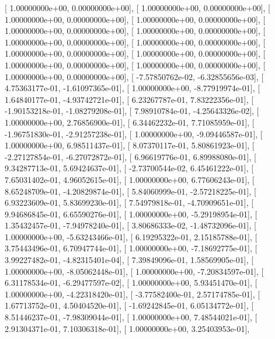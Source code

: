 \documentclass{article}
\begin{document}
       [  1.00000000e+00,   0.00000000e+00],
       [  1.00000000e+00,   0.00000000e+00],
       [  1.00000000e+00,   0.00000000e+00],
       [  1.00000000e+00,   0.00000000e+00],
       [  1.00000000e+00,   0.00000000e+00],
       [  1.00000000e+00,   0.00000000e+00],
       [  1.00000000e+00,   0.00000000e+00],
       [  1.00000000e+00,   0.00000000e+00],
       [  1.00000000e+00,   0.00000000e+00],
       [  1.00000000e+00,   0.00000000e+00],
       [  1.00000000e+00,   0.00000000e+00],
       [  1.00000000e+00,   0.00000000e+00],
       [  1.00000000e+00,   0.00000000e+00],
       [ -7.57850762e-02,  -6.32855656e-03],
       [  4.75363177e-01,  -1.61097365e-01],
       [  1.00000000e+00,  -8.77919974e-01],
       [  1.64840177e-01,  -4.93742721e-01],
       [  6.23267787e-01,   7.83222356e-01],
       [ -1.90153218e-01,  -1.08279208e-01],
       [  7.98910784e-01,  -4.25643326e-02],
       [  1.00000000e+00,   2.76856900e-01],
       [  6.34462232e-01,   7.71085959e-01],
       [ -1.96751830e-01,  -2.91257238e-01],
       [  1.00000000e+00,  -9.09446587e-01],
       [  1.00000000e+00,   6.98511437e-01],
       [  8.07370117e-01,   5.80861923e-01],
       [ -2.27127854e-01,  -6.27072872e-01],
       [  6.96619776e-01,   6.89988080e-01],
       [  9.34287713e-01,   5.69424637e-01],
       [ -2.73700544e-02,   6.45461222e-01],
       [  7.65031402e-01,   4.96052615e-01],
       [  1.00000000e+00,   6.77606243e-01],
       [  8.65248709e-01,  -4.20829874e-01],
       [  5.84060999e-01,  -2.57218225e-01],
       [  6.93223609e-01,   5.83699230e-01],
       [  7.54979818e-01,  -4.70909651e-01],
       [  9.94686845e-01,   6.65590276e-01],
       [  1.00000000e+00,  -5.29198954e-01],
       [  1.35432457e-01,  -7.94978240e-01],
       [  3.80686333e-02,  -1.48732096e-01],
       [  1.00000000e+00,  -5.63243466e-01],
       [  6.19295322e-01,   2.15185788e-01],
       [  3.75443496e-01,   6.70947744e-01],
       [  1.00000000e+00,  -7.18692775e-01],
       [  3.99227482e-01,  -4.82315401e-04],
       [  7.39849096e-01,   1.58569905e-01],
       [  1.00000000e+00,  -8.05062448e-01],
       [  1.00000000e+00,  -7.20834597e-01],
       [  6.31178534e-01,  -6.29477597e-02],
       [  1.00000000e+00,   5.93451470e-01],
       [  1.00000000e+00,  -4.22318420e-01],
       [ -3.77582400e-01,   2.57174785e-01],
       [  1.67713752e-01,   4.50404520e-01],
       [ -1.69242845e-01,   6.05134772e-01],
       [  8.51446237e-01,  -7.98309044e-01],
       [  1.00000000e+00,   7.48544021e-01],
       [  2.91304371e-01,   7.10306318e-01],
       [  1.00000000e+00,   3.25403953e-01],
\end{document}
